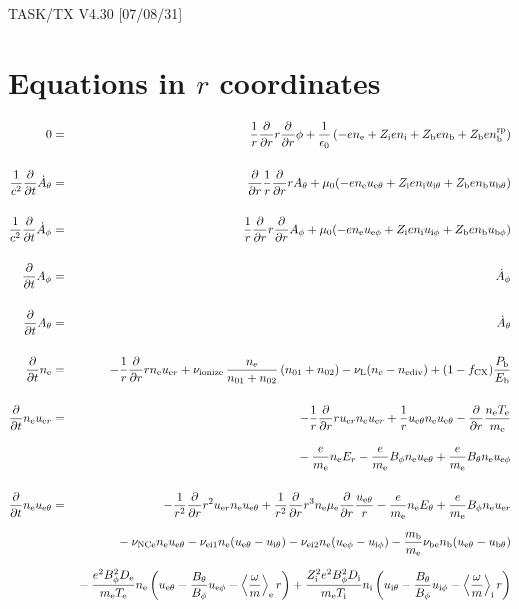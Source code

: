 \documentclass[11pt]{article}
\def\r#1{{\rm#1}}
\def\ddt{\frac{\partial}{\partial t}}
\def\ddr{\frac{\partial}{\partial r}}
\def\ave#1{\left\langle#1\right\rangle}
\def\me{m_\r{e}}
\def\mb{m_\r{b}}
\def\mue{\mu_\r{e}}
\def\De{D_\r{e}}
\def\Di{D_\r{i}}
\def\ne{n_\r{e}}
\def\ni{n_\r{i}}
\def\nb{n_\r{b}}
\def\uer{u_{\r{e}r}}
\def\ueth{u_{\r{e}\theta}}
\def\uith{u_{\r{i}\theta}}
\def\ubth{u_{\r{b}\theta}}
\def\ueph{u_{\r{e}\phi}}
\def\uiph{u_{\r{i}\phi}}
\def\ubph{u_{\r{b}\phi}}
\def\Er{E_r}
\def\Eth{E_\theta}
\def\Bth{B_\theta}
\def\Bph{B_\phi}
\def\Athd{\dot{A}_\theta}
\def\Aphd{\dot{A}_\phi}
\def\Ath{A_\theta}
\def\Aph{A_\phi}
\def\Te{T_\r{e}}
\def\Ti{T_\r{i}}
\def\nna{n_{01}}
\def\nnb{n_{02}}
\def\Zi{Z_\r{i}}
\def\Zb{Z_\r{b}}
\def\Pb{P_\r{b}}
\def\Eb{E_\r{b}}
\def\nbrp{n_\r{b}^\r{rp}}
\def\fCX{f_\r{CX}}
\def\nuNCe{\nu_\r{NCe}}
\def\nuL{\nu_\r{L}}
\def\nuion{\nu_\r{ionize}}
\def\nediv{n_\r{ediv}}
\begin{document}
\begin{center}
TASK/TX V4.30 [07/08/31]
\end{center}

\section{Equations in $r$ coordinates}
\vspace{-5mm}

\begin{eqnarray}
%
%
  0 &=&
%
    \frac{1}{r} \ddr r \ddr \phi
%
  + \frac{1}{\epsilon_0}
%
    \left(-e \ne + \Zi e \ni + \Zb e \nb + \Zb e \nbrp \right)
\\[5mm]
%
%
  \frac{1}{c^2} \ddt \Athd &=&
%
    \ddr \frac{1}{r} \ddr r \Ath
%
  + \mu_0 (-e \ne \ueth + \Zi e \ni \uith + \Zb e \nb \ubth)
\\[5mm]
%
%
  \frac{1}{c^2} \ddt \Aphd &=&
%
  \frac{1}{r} \ddr r \ddr \Aph
%
  + \mu_0 (-e \ne \ueph + \Zi e \ni \uiph + \Zb e \nb \ubph)
%
\\[5mm]
%
%
  \ddt \Aph &=&
%
  \Aphd
\\[5mm]
%
%
  \ddt \Ath &=&
%
  \Athd
\\[5mm]
%
%
  \ddt\ne &=&
%
  - \frac{1}{r} \ddr r \ne \uer 
%
  + \nuion\, \frac{\ne}{\nna+\nnb}\, (\nna+\nnb)
%
  - \nuL (\ne - \nediv)
%
  + (1 - \fCX) \frac{\Pb}{\Eb}
\\[5mm]
%
%
  \ddt \ne \uer &=&
%
  - \frac{1}{r} \ddr r \uer \ne \uer
%
  + \frac{1}{r} \ueth \ne \ueth
%
  - \ddr \frac{\ne \Te}{\me}
\nonumber\\[3mm]&&{}
%
  - \frac{e}{\me} \ne \Er
%
  - \frac{e}{\me} \Bph \ne \ueth
%
  + \frac{e}{\me} \Bth \ne \ueph
\\[5mm]
%
%
  \ddt \ne \ueth &=&
%
  - \frac{1}{r^2} \ddr r^2 \uer \ne \ueth
%
  + \frac{1}{r^2} \ddr r^3 \ne \mue \ddr \frac{\ueth}{r}
%
  - \frac{e}{\me} \ne \Eth
%
  + \frac{e}{\me} \Bph \ne \uer
\nonumber\\[2.5mm]&&{}
%
  - \nuNCe \ne \ueth
%
  - \nu_\r{ei1} \ne (\ueth - \uith)
%
  - \nu_\r{ei2} \ne (\ueph - \uiph)
%
  - \frac{\mb}{\me} \nu_\r{be} \nb (\ueth - \ubth)
\nonumber\\[2.5mm]&&{}
%
  - \frac{e^2 \Bph^2 \De}{\me\Te}\ne
    \left(\ueth - \frac{\Bth}{\Bph}\ueph - \ave{\frac{\omega}{m}}_\r{e}
     r \right)
%
   + \frac{\Zi^2 e^2 \Bph^2 \Di}{\me\Ti}\ni
    \left(\uith - \frac{\Bth}{\Bph}\uiph - \ave{\frac{\omega}{m}}_\r{i}
     r \right)
\nonumber\\[2.5mm]&&{}

\end{eqnarray}
\end{document}
